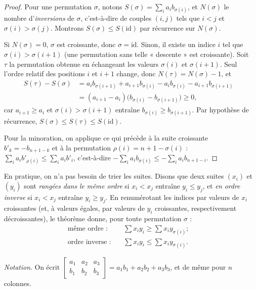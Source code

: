 \documentclass[11pt]{article}
\begin{document}
\begin{proof}
Pour une permutation $\sigma$, notons
$S(\sigma) = \sum_i a_i b_{\sigma(i)}$, et $N(\sigma)$ le nombre
d'\emph{inversions} de $\sigma$, c'est-à-dire de couples $(i, j)$ tels
que $i < j$ et $\sigma(i) > \sigma(j)$. Montrons $S(\sigma) \leqslant S(\mathrm{id})$
par récurrence sur $N(\sigma)$.

Si $N(\sigma) = 0$, $\sigma$ est croissante, donc $\sigma = \mathrm{id}$.
Sinon, il existe un indice $i$ tel que $\sigma(i) > \sigma(i+1)$ (une
permutation sans telle « descente » est croissante). Soit $\tau$ la
permutation obtenue en échangeant les valeurs $\sigma(i)$ et $\sigma(i+1)$.
Seul l'ordre relatif des positions $i$ et $i+1$ change, donc
$N(\tau) = N(\sigma) - 1$, et
\begin{align*}
S(\tau) - S(\sigma)
&= a_i b_{\sigma(i+1)} + a_{i+1} b_{\sigma(i)} - a_i b_{\sigma(i)} - a_{i+1} b_{\sigma(i+1)} \\
&= (a_{i+1} - a_i)\bigl(b_{\sigma(i)} - b_{\sigma(i+1)}\bigr) \geqslant 0,
\end{align*}
car $a_{i+1} \geqslant a_i$ et $\sigma(i) > \sigma(i+1)$ entraîne
$b_{\sigma(i)} \geqslant b_{\sigma(i+1)}$. Par hypothèse de récurrence,
$S(\sigma) \leqslant S(\tau) \leqslant S(\mathrm{id})$.

Pour la minoration, on applique ce qui précède à la suite croissante
$b'_k = -b_{n+1-k}$ et à la permutation $\rho(i) = n + 1 - \sigma(i)$ :
$\sum_i a_i b'_{\rho(i)} \leqslant \sum_i a_i b'_i$, c'est-à-dire
$-\sum_i a_i b_{\sigma(i)} \leqslant -\sum_i a_i b_{n+1-i}$.
\end{proof}

En pratique, on n'a pas besoin de trier les suites. Disons que deux suites
$(x_i)$ et $(y_i)$ sont \emph{rangées dans le même ordre} si $x_i < x_j$
entraîne $y_i \leqslant y_j$, et \emph{en ordre inverse} si $x_i < x_j$
entraîne $y_i \geqslant y_j$. En renumérotant les indices par valeurs de
$x_i$ croissantes (et, à valeurs égales, par valeurs de $y_i$
croissantes, respectivement décroissantes), le théorème donne, pour toute
permutation $\sigma$ :
\begin{align*}
\text{même ordre :} &\quad \sum x_i y_i \geqslant \sum x_i y_{\sigma(i)} ; \\
\text{ordre inverse :} &\quad \sum x_i y_i \leqslant \sum x_i y_{\sigma(i)} .
\end{align*}

\emph{Notation.} On écrit
$\begin{bmatrix} a_1 & a_2 & a_3 \\ b_1 & b_2 & b_3 \end{bmatrix}
= a_1 b_1 + a_2 b_2 + a_3 b_3$, et de même pour $n$ colonnes.
\end{document}
